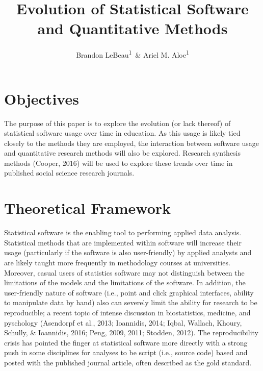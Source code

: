 \documentclass[english,man]{apa6}
\title{Evolution of Statistical Software and Quantitative Methods}
\author{Brandon LeBeau\textsuperscript{1}~\& Ariel M. Aloe\textsuperscript{1}}
\affiliation{
    \vspace{0.5cm}
          \textsuperscript{1} University of Iowa  }
\theoremstyle{definition}
\theoremstyle{definition}
\theoremstyle{definition}
\theoremstyle{remark}
\begin{document}
\maketitle

\setcounter{secnumdepth}{0}



\hypertarget{objectives}{%
\section{Objectives}\label{objectives}}

The purpose of this paper is to explore the evolution (or lack thereof)
of statistical software usage over time in education. As this usage is
likely tied closely to the methods they are employed, the interaction
between software usage and quantitative research methods will also be
explored. Research synthesis methods (Cooper, 2016) will be used to
explore these trends over time in published social science research
journals.

\hypertarget{theoretical-framework}{%
\section{Theoretical Framework}\label{theoretical-framework}}

Statistical software is the enabling tool to performing applied data
analysis. Statistical methods that are implemented within software will
increase their usage (particularly if the software is also
user-friendly) by applied analysts and are likely taught more frequently
in methodology courses at universities. Moreover, casual users of
statistics software may not distinguish between the limitations of the
models and the limitations of the software. In addition, the
user-friendly nature of software (i.e., point and click graphical
interfaces, ability to manipulate data by hand) also can severely limit
the ability for research to be reproducible; a recent topic of intense
discussion in biostatistics, medicine, and pyschology (Asendorpf et al.,
2013; Ioannidis, 2014; Iqbal, Wallach, Khoury, Schully, \& Ioannidis,
2016; Peng, 2009, 2011; Stodden, 2012). The reproducibility crisis has
pointed the finger at statistical software more directly with a strong
push in some disciplines for analyses to be script (i.e., source code)
based and posted with the published journal article, often described as
the gold standard.
\end{document}
